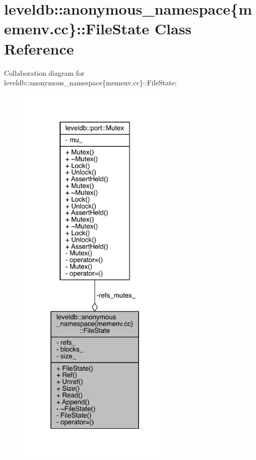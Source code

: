 \hypertarget{classleveldb_1_1anonymous__namespace_02memenv_8cc_03_1_1_file_state}{}\section{leveldb\+:\+:anonymous\+\_\+namespace\{memenv.\+cc\}\+:\+:File\+State Class Reference}
\label{classleveldb_1_1anonymous__namespace_02memenv_8cc_03_1_1_file_state}


Collaboration diagram for leveldb\+:\+:anonymous\+\_\+namespace\{memenv.\+cc\}\+:\+:File\+State\+:
\nopagebreak
\begin{figure}[H]
\begin{center}
\leavevmode
\includegraphics[width=210pt]{classleveldb_1_1anonymous__namespace_02memenv_8cc_03_1_1_file_state__coll__graph}
\end{center}
\end{figure}
